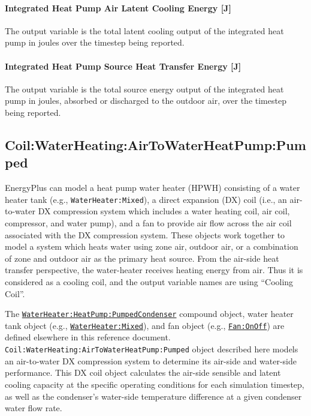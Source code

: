 \paragraph{Integrated Heat Pump Air Latent Cooling Energy {[}J{]}}\label{Out-Total-LatCooling-Energy-ASIHP}
The output variable is the total latent cooling output of the integrated heat pump in joules over the timestep being reported.

\paragraph{Integrated Heat Pump Source Heat Transfer Energy {[}J{]}}\label{Out-Total-Source-Energy-ASIHP}
The output variable is the total source energy output of the integrated heat pump in joules, absorbed or discharged to the outdoor air, over the timestep being reported.

\subsection{Coil:WaterHeating:AirToWaterHeatPump:Pumped}\label{coilwaterheatingairtowaterheatpumppumped}

EnergyPlus can model a heat pump water heater (HPWH) consisting of a water heater tank (e.g., \lstinline!WaterHeater:Mixed!), a direct expansion (DX) coil (i.e., an air-to-water DX compression system which includes a water heating coil, air coil, compressor, and water pump), and a fan to provide air flow across the air coil associated with the DX compression system. These objects work together to model a system which heats water using zone air, outdoor air, or a combination of zone and outdoor air as the primary heat source. From the air-side heat transfer perspective, the water-heater receives heating energy from air. Thus it is considered as a cooling coil, and the output variable names are using ``Cooling Coil''.

The \hyperref[waterheaterheatpumppumpedcondenser]{\lstinline!WaterHeater:HeatPump:PumpedCondenser!} compound object, water heater tank object (e.g., \hyperref[waterheatermixed]{\lstinline!WaterHeater:Mixed!}), and fan object (e.g., \hyperref[fanonoff]{\lstinline!Fan:OnOff!}) are defined elsewhere in this reference document. \lstinline!Coil:WaterHeating:AirToWaterHeatPump:Pumped! object described here models an air-to-water DX compression system to determine its air-side and water-side performance. This DX coil object calculates the air-side sensible and latent cooling capacity at the specific operating conditions for each simulation timestep, as well as the condenser's water-side temperature difference at a given condenser water flow rate.

